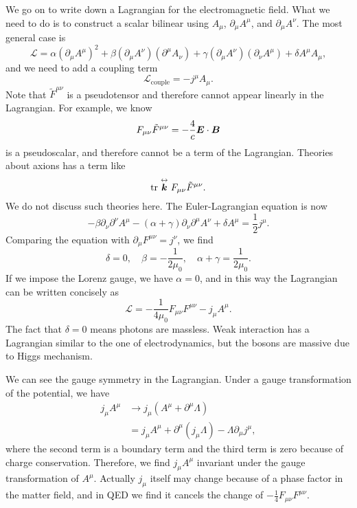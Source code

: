 \documentclass[hyperref, a4paper]{article}
\renewcommand{\tensor}[1]{ \stackrel{\leftrightarrow}{\vb*{#1}}}
\begin{document}
We go on to write down a Lagrangian for the electromagnetic field. What we need to do is to construct a 
scalar bilinear using $A_\mu$, $\partial_\mu A^\mu$, and $\partial_\mu A^\nu$. The most general case is 
\[
    \mathcal{L} = \alpha (\partial_\mu A^\mu)^2 + \beta (\partial_\mu A^\nu) (\partial^\mu A_\nu)
    + \gamma (\partial_\mu A^\nu) (\partial_\nu A^\mu) + \delta A^\mu A_\mu,
\]
and we need to add a coupling term 
\[
    \mathcal{L}_\text{couple} = - j^\mu A_\mu.
\]
Note that $\tilde{F}^{\mu \nu}$ is a pseudotensor and therefore cannot appear linearly in the Lagrangian.
For example, we know 
\[
    F_{\mu \nu} \tilde{F}^{\mu \nu} = - \frac{4}{c} \vb*{E} \cdot \vb*{B}
\]
is a pseudoscalar, and therefore cannot be a term of the Lagrangian. Theories about axions has a term like 
\[
    \trace \tensor{\vb*{k}} F_{\mu \nu} \tilde{F}^{\mu \nu} .
\]
We do not discuss such theories here. The Euler-Lagrangian equation is now 
\[
    - \beta \partial_\nu \partial^\nu A^\mu - (\alpha + \gamma) \partial_\nu \partial^\mu A^\nu + \delta A^\mu = \frac{1}{2} j^\mu.
\]
Comparing the equation with $\partial_\mu F^{\mu \nu} = j^\nu$, we find 
\[
    \delta = 0, \quad \beta = - \frac{1}{2 \mu_0} , \quad \alpha + \gamma = \frac{1}{2 \mu_0}.
\]
If we impose the Lorenz gauge, we have $\alpha = 0$, and in this way the Lagrangian can be written concisely as 
\begin{equation}
    \mathcal{L} = - \frac{1}{4 \mu_0} F_{\mu \nu} F^{\mu \nu} - j_\mu A^\mu.
    \label{eq:lagrangian-coupled-em}
\end{equation} 
The fact that $\delta = 0$ means photons are massless. Weak interaction has a Lagrangian similar to the one of 
electrodynamics, but the bosons are massive due to Higgs mechanism. 

We can see the gauge symmetry in the Lagrangian. Under a gauge transformation of the potential, we have 
\[
    \begin{aligned}
        j_\mu A^\mu &\longrightarrow j_\mu (A^\mu + \partial^\mu \Lambda) \\
        &= j_\mu A^\mu + \partial^\mu (j_\mu \Lambda) - \Lambda \partial_\mu j^\mu,
    \end{aligned}
\]
where the second term is a boundary term and the third term is zero because of charge conservation.
Therefore, we find $j_\mu A^\mu$ invariant under the gauge transformation of $A^\mu$. Actually $j_\mu$ itself
may change because of a phase factor in the matter field, and in QED we find it cancels the change of $- \frac{1}{4} F_{\mu \nu} F^{\mu \nu}$.
\end{document}
